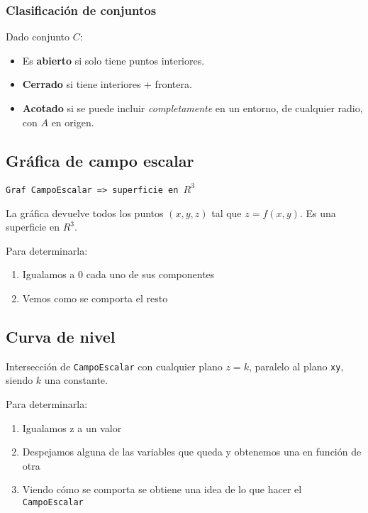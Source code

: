 \subsubsection{Clasificación de conjuntos}

Dado conjunto \(C\):

\begin{itemize}
    \item Es \textbf{abierto} si solo tiene puntos interiores.
    \item \textbf{Cerrado} si tiene interiores + frontera.
    \item \textbf{Acotado} si se puede incluir \textit{completamente} en un entorno, de cualquier radio,
          con \(A\) en origen.
\end{itemize}

\subsection{Gráfica de campo escalar}

\texttt{Graf CampoEscalar => superficie en \(R^{3}\)}

La gráfica devuelve todos los puntos \((x,y,z)\) tal que \(z = f(x,y)\).
Es una superficie en \(R^{3}\).

Para determinarla:

\begin{enumerate}
    \item Igualamos a 0 cada uno de sus componentes
    \item Vemos como se comporta el resto
\end{enumerate}

\subsection{Curva de nivel}

Intersección de \texttt{CampoEscalar} con cualquier plano \(z = k\),
paralelo al plano \texttt{xy}, siendo \(k\) una constante.

Para determinarla:

\begin{enumerate}
    \item Igualamos z a un valor
    \item Despejamos alguna de las variables que queda y obtenemos una en función de otra
    \item Viendo cómo se comporta se obtiene una idea de lo que hacer el \texttt{CampoEscalar}
\end{enumerate}

